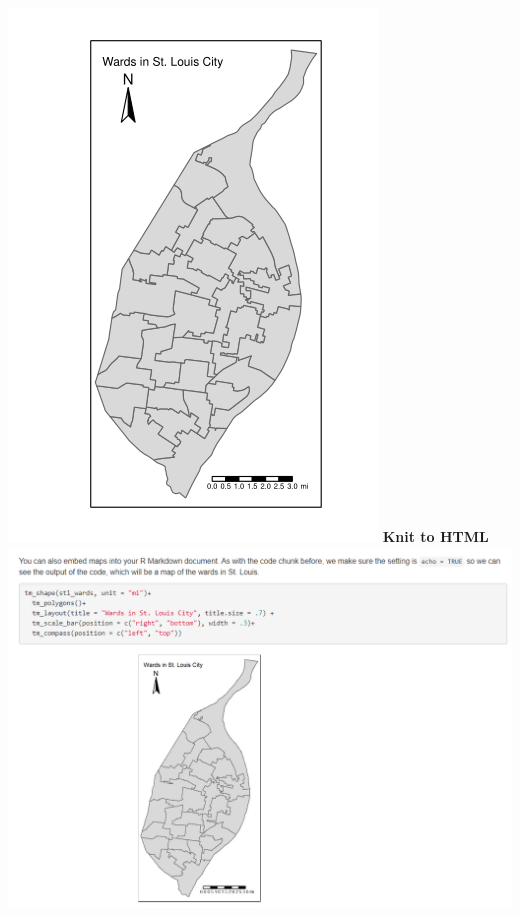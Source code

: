 \documentclass[
  krantz2]{krantz}
\begin{document}
\includegraphics{images/pdf_output2.png}
\textbf{Knit to HTML}
\includegraphics{images/html_output.png}
\end{document}
